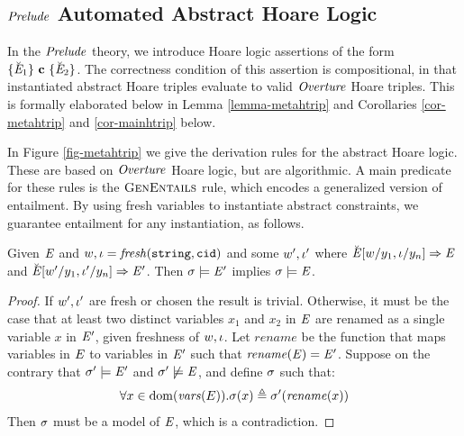 \subsection{$\mathit{Prelude}$ Automated Abstract Hoare Logic}
\label{section-metahtrip}

In the $\mathit{Prelude}$ theory, we introduce Hoare logic assertions
of the form $\{ \breve{\mathit{E}}_1 \}\ \mathbf{c}\ \{ \breve{\mathit{E}}_2 \}$. The correctness
condition of this assertion is compositional, in that instantiated
abstract Hoare triples evaluate to valid $\mathit{Overture}$ Hoare triples.
This is formally elaborated below in Lemma
\ref{lemma-metahtrip} and Corollaries \ref{cor-metahtrip} and
\ref{cor-mainhtrip} below.

In Figure \ref{fig-metahtrip} we give the derivation rules for the
abstract Hoare logic. These are based on $\mathit{Overture}$ Hoare logic, but
are algorithmic. A main predicate for these rules is the
$\text{\sc GenEntails}$ rule, which encodes a generalized version of
entailment. By using fresh variables to instantiate abstract
constraints, we guarantee entailment for any instantiation, as
follows.

\begin{lemma}
  \label{lemma-fresh}
  Given $\mathit{E}$ and $w, \iota = \mathit{fresh}(\texttt{string}, \texttt{cid})$ and
  some $w',\iota'$ where 
  $\breve{\mathit{E}}[w/y_1,\iota/y_n] \Rightarrow \mathit{E}$ and
  $\breve{\mathit{E}}[w'/y_1,\iota'/y_n] \Rightarrow \mathit{E}'$.
  Then $\sigma \models \mathit{E}'$ implies $\sigma \models \mathit{E}$. 
\end{lemma}

\begin{proof}
  If $w',\iota'$ are fresh or chosen the result is
  trivial.  Otherwise, it must be the case that at least two
  distinct variables $x_1$ and $x_2$ in $\mathit{E}$ are renamed as a single
  variable $x$ in $\mathit{E}'$, given freshness of $w,\iota$. Let
  $\mathit{rename}$ be the function that maps variables in $\mathit{E}$ to
  variables in $\mathit{E}'$ such that $\mathit{rename}(\mathit{E}) = \mathit{E}'$. Suppose
  on the contrary that 
  $\sigma' \models \mathit{E}'$ and $\sigma' \not\models \mathit{E}$, and define $\sigma$ such that:
  $$
  \forall x \in \mathrm{dom}(\mathit{vars}(E)) . \sigma(x) \triangleq \sigma'(\mathit{rename}(x)) 
  $$
  Then $\sigma$ must be a model of $\mathit{E}$, which is a contradiction. 
\end{proof}

